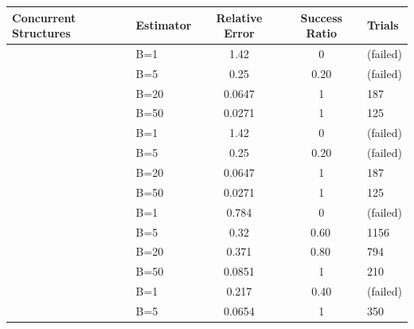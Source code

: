 \documentclass[acmsmall]{acmart}
\begin{document}
\begin{table}[t]
  \centering
  \tiny
  \begin{tabular}{@{} l l S[scientific-notation=true] S[table-format=1.2] l @{}}
    \toprule
    \textbf{Concurrent Structures} & \textbf{Estimator} & \textbf{Relative Error} & \textbf{Success Ratio} & \textbf{Trials} \\
    \midrule

    &  B=1 & \num{1.42} & \num{0} & (failed) \\
    &  B=5      & \num{0.25} & \num{0.20} & (failed) \\
    &  B=20     & \num{0.0647} & {1 } & \num{187} \\
    &  B=50     & \num{0.0271} & {1} & \num{125} \\
    \midrule
     &  B=1 & \num{1.42} & \num{0} & (failed) \\
    &  B=5      & \num{0.25} & \num{0.20} & (failed) \\
    &  B=20     & \num{0.0647} & {1} & \num{187} \\
    &  B=50     & \num{0.0271} & {1} & \num{125} \\
    \midrule
      & B=1 & \num{0.784} & \num{0} & (failed) \\
    &  B=5      & \num{0.32} & {\num{0.60}\,} & \num{1156} \\
    &  B=20     & \num{0.371} & {\num{0.80}\,} & \num{794} \\
    &  B=50     & \num{0.0851} & {1} & \num{210} \\
    \midrule
     &  B=1             & \num{0.217} & \num{0.40} & (failed) \\
    &  B=5            & \num{0.0654} & {1} & \num{350} \\

\end{tabular}
\end{table}
\end{document}
